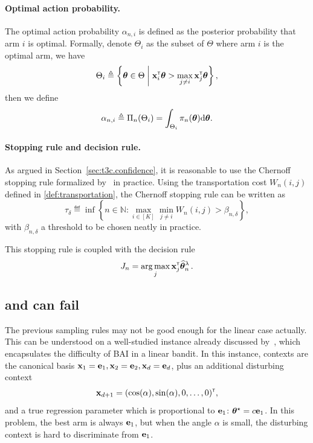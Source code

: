 \paragraph{Optimal action probability.} 
The optimal action probability $\alpha_{n,i}$ is defined as the posterior probability that arm $i$ is optimal. Formally, denote $\Theta_i$ as the subset of $\Theta$ where arm $i$ is the optimal arm, we have
\[
    \Theta_i \triangleq \left\{ {\boldsymbol \theta}\in\Theta \biggm| {\bf x}_i^\mathsf{\scriptscriptstyle T}{\boldsymbol \theta} > \max_{j\neq i}{\bf x}_j^\mathsf{\scriptscriptstyle T}{\boldsymbol \theta} \right\},
\]
then we define
\[
   \alpha_{n,i} \triangleq \Pi_{n}(\Theta_i) = \int_{\Theta_i} \pi_n({\boldsymbol \theta}) \text{d} {\boldsymbol \theta}.
\]

\paragraph{Stopping rule and decision rule.}
As argued in Section~\ref{sec:t3c.confidence}, it is reasonable to use the Chernoff stopping rule formalized by~\cite{garivier2016tracknstop} in practice. Using the transportation cost $W_n(i,j)$ defined in \eqref{def:transportation}, the Chernoff stopping rule can be written as
\begin{equation}\label{eq:chernoffstoppingtime}
\tau_\delta \eqdef \inf \left\lbrace n \in \mathbb{N} : \max_{i \in [K]} \min_{j \neq i } W_{n}(i,j) > \beta_{n,\delta} \right\rbrace,
\end{equation}
with $\beta_{n,\delta}$ a threshold to be chosen neatly in practice. 

This stopping rule is coupled with the decision rule 
\[
    J_n = \operatorname*{arg\,max}_{j}{\bf x}_j^\mathsf{\scriptscriptstyle T}\widehat{{\boldsymbol \theta}}_n^{\lambda}\,.
\]

\subsection{\TTTS{} and \TCC{} can fail}\label{sec:lgc.bayesian.fail}

The previous sampling rules may not be good enough for the linear case actually. This can be understood on a well-studied instance already discussed by~\cite{soare2014linear,xu2018linear}, which encapsulates the difficulty of BAI in a linear bandit. In this instance, contexts are the canonical basis  ${\bf x}_1 = {\bf e}_1, {\bf x}_2 = {\bf e}_2, {\bf x}_d = {\bf e}_d$, plus an additional disturbing context \[{\bf x}_{d+1} = (\cos(\alpha), \sin(\alpha), 0, \ldots, 0)^\mathsf{\scriptscriptstyle T},\] and a true regression parameter which is proportional to ${\bf e}_1$: ${\boldsymbol \theta}^\star = c{\bf e}_1$. In this problem, the best arm is always ${\bf e}_1$, but when the angle $\alpha$ is small, the disturbing context is hard to discriminate from ${\bf e}_1$. 

